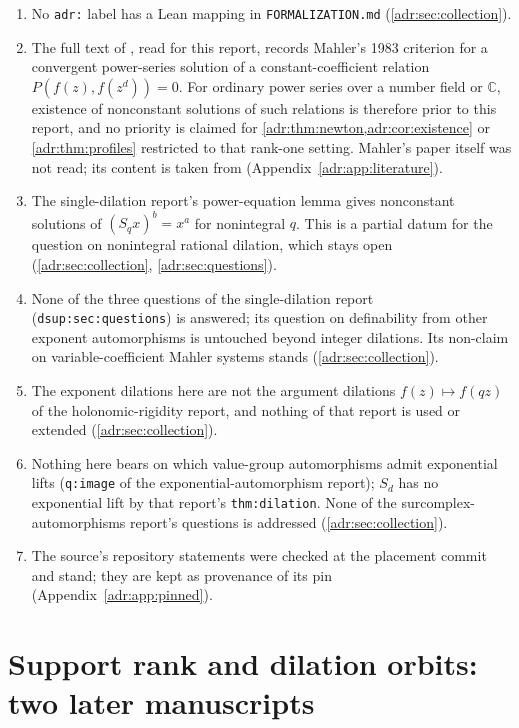 \documentclass[11pt,letterpaper]{article}
\numberwithin{equation}{section}
\theoremstyle{definition}
\theoremstyle{remark}
\newcommand{\C}{\mathbb C}
\newcommand{\rpath}[1]{\nolinkurl{#1}}%
\newcommand{\lbl}[1]{\nolinkurl{#1}}%
\begin{document}
\begin{enumerate}[label=W\arabic*.,leftmargin=2.6em,itemsep=2pt]
\item No \texttt{adr:} label has a Lean mapping in \rpath{FORMALIZATION.md}
(\cref{adr:sec:collection}).
\item The full text of \cite{NN}, read for this report, records Mahler's
1983 criterion \cite{Mahler83} for a convergent power-series solution of a
constant-coefficient relation $P(f(z),f(z^d))=0$. For ordinary power series
over a number field or $\C$, existence of nonconstant solutions of such
relations is therefore prior to this report, and no priority is claimed for
\cref{adr:thm:newton,adr:cor:existence} or \cref{adr:thm:profiles} restricted
to that rank-one setting. Mahler's paper itself was not read; its content
is taken from \cite{NN} (Appendix~\ref{adr:app:literature}).
\item The single-dilation report's power-equation lemma gives nonconstant
solutions of $(S_qx)^b=x^a$ for nonintegral $q$. This is a partial datum
for the question on nonintegral rational dilation, which stays open
(\cref{adr:sec:collection}, \cref{adr:sec:questions}).
\item None of the three questions of the single-dilation report
(\lbl{dsup:sec:questions}) is answered; its question on definability from
other exponent automorphisms is untouched beyond integer dilations. Its
non-claim on variable-coefficient Mahler systems stands
(\cref{adr:sec:collection}).
\item The exponent dilations here are not the argument dilations
$f(z)\mapsto f(qz)$ of the holonomic-rigidity report, and nothing of that
report is used or extended (\cref{adr:sec:collection}).
\item Nothing here bears on which value-group automorphisms admit
exponential lifts (\lbl{q:image} of the exponential-automorphism report);
$S_d$ has no exponential lift by that report's \lbl{thm:dilation}. None of
the surcomplex-automorphisms report's questions is addressed
(\cref{adr:sec:collection}).
\item The source's repository statements were checked at the placement
commit and stand; they are kept as provenance of its pin
(Appendix~\ref{adr:app:pinned}).
\end{enumerate}

\section{Support rank and dilation orbits: two later manuscripts}
\label{adr:sr:sec:intro}
\end{document}
